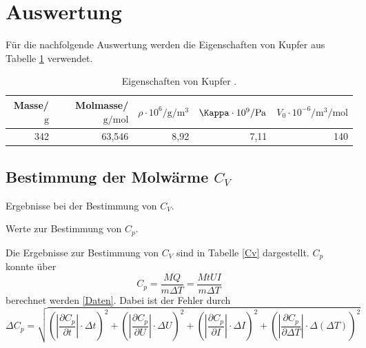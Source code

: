 \newpage
\section{Auswertung} %
\label{sec:auswertung}

Für die nachfolgende Auswertung werden die Eigenschaften von Kupfer aus Tabelle \ref{Eigenschaften} verwendet.

\begin{table}[!h]
	\centering
	\caption[]{Eigenschaften von Kupfer \cite{kupfer1}\cite{kupfer2}.}
	\begin{tabular}{rrrrr}
		\toprule
		Masse/$\si{\gram}$ & Molmasse/$\si{\gram\per\mol}$ & $\rho \cdot 10^6/\si{\gram\per\meter^3}$ & $\Kappa \cdot 10^9/\si{\pascal}$ & $V_0 \cdot 10^{-6}/\si{\meter^3\per\mol}$\\
		\midrule
		342 & 63,546 & 8,92 & 7,11 & 140\\
		\bottomrule
	\end{tabular}
	\label{Eigenschaften}
\end{table}

\FloatBarrier
\subsection{Bestimmung der Molwärme $C_V$} %
\label{sub:bestimmung_von_c__mathrm}

\begin{table}[!h]
	\caption[]{Ergebnisse bei der Bestimmung von $C_V$.}
	\centering
	
	\label{Cv}
\end{table}

\begin{table}[!h]
	\centering
	\caption[]{Werte zur Bestimmung von $C_p$.}
	
	\label{Daten}
\end{table}

Die Ergebnisse zur Bestimmung von $C_V$ sind in Tabelle \ref{Cv} dargestellt.
$C_p$ konnte über
\begin{equation*}
	C_p = \frac{M Q}{m \Delta T} = \frac{M t U I}{m \Delta T}
\end{equation*}
berechnet werden \ref{Daten}.
Dabei ist der Fehler durch
\begin{equation*}
	\Delta C_p = \sqrt{\left(|\frac{\partial C_p}{\partial t}|\cdot \Delta t \right)^2 + \left(|\frac{\partial C_p}{\partial U}|\cdot \Delta U \right)^2 + \left(|\frac{\partial C_p}{\partial I}|\cdot \Delta I \right)^2 + \left(|\frac{\partial C_p}{\partial \Delta T}|\cdot \Delta (\Delta T) \right)^2}
\end{equation*}

